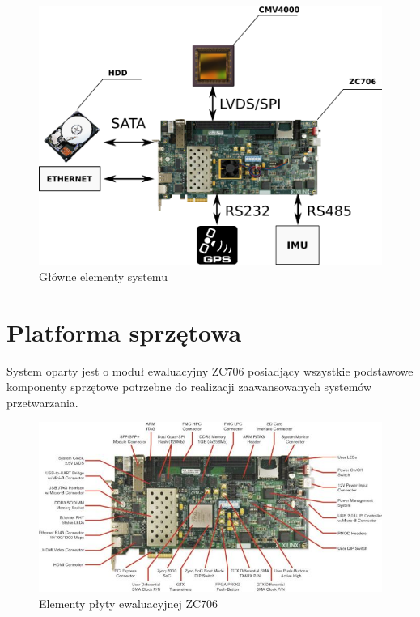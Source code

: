 \documentclass[a4paper,11pt,oneside]{book}  %
\begin{document}
\begin{figure}[!h]
	\centering
	\includegraphics[width=12cm]{OVER2.png}
	\caption{Główne elementy systemu}
	\label{fig:OVER}
\end{figure}

\section{Platforma sprzętowa}
System oparty jest o moduł ewaluacyjny ZC706 posiadjący wszystkie podstawowe komponenty sprzętowe potrzebne do realizacji zaawansowanych systemów przetwarzania.

\begin{figure}[H]
	\centering
	\includegraphics[width=12cm]{zc706-base-board.jpg}
	\caption{Elementy płyty ewaluacyjnej ZC706}
	\label{fig:ZC706}
\end{figure}
\end{document}
